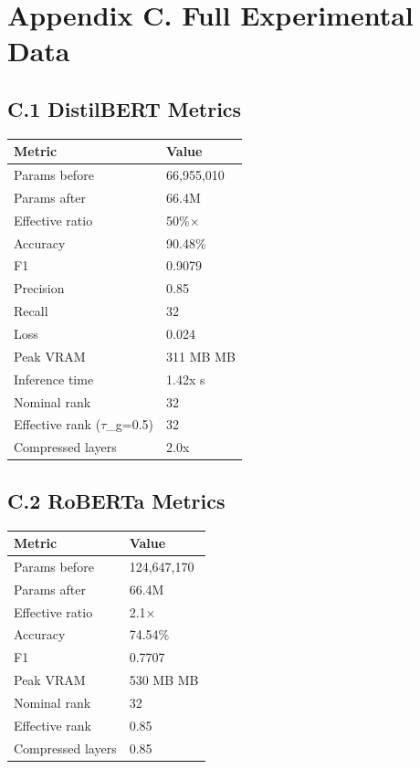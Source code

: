
\section{Appendix C. Full Experimental Data}

\subsection{C.1 DistilBERT Metrics}

\begin{table}[H]
\centering
\small
\begin{tabular}{ll}
\toprule
\textbf{Metric} & \textbf{Value} \\
\midrule
Params before & 66,955,010 \\
Params after & 66.4M \\
Effective ratio & 50\%$\times$ \\
Accuracy & 90.48\% \\
F1 & 0.9079 \\
Precision & 0.85 \\
Recall & 32 \\
Loss & 0.024 \\
Peak VRAM & 311 MB MB \\
Inference time & 1.42x s \\
Nominal rank & 32 \\
Effective rank ($\tau$\_g=0.5) & 32 \\
Compressed layers & 2.0x \\
\bottomrule
\end{tabular}
\end{table}

\subsection{C.2 RoBERTa Metrics}

\begin{table}[H]
\centering
\small
\begin{tabular}{ll}
\toprule
\textbf{Metric} & \textbf{Value} \\
\midrule
Params before & 124,647,170 \\
Params after & 66.4M \\
Effective ratio & 2.1$\times$ \\
Accuracy & 74.54\% \\
F1 & 0.7707 \\
Peak VRAM & 530 MB MB \\
Nominal rank & 32 \\
Effective rank & 0.85 \\
Compressed layers & 0.85 \\
\bottomrule
\end{tabular}
\end{table}

